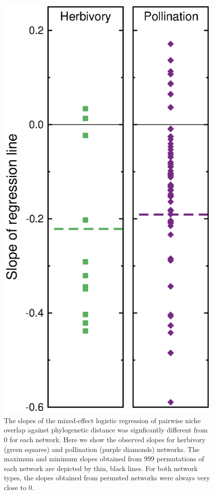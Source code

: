 \documentclass[12pt]{article}
\begin{document}
  \begin{figure}[!h]
    \begin{center}
      \centerline{\includegraphics*[height=.75\textwidth]{Figures/dataplots/observed_vs_random.eps}}
    \end{center}
     \caption{The slopes of the mixed-effect logistic regression of pairwise niche overlap against phylogenetic distance was signficantly different from 0 for each network. Here we show the observed slopes for herbivory (green squares) and pollination (purple diamonds) networks. The maximum and minimum slopes obtained from 999 permutations of each network are depicted by thin, black lines. For both network types, the slopes obtained from permuted networks were always very close to 0.}
    \label{obs_vs_random} 
  \end{figure}
\end{document}

